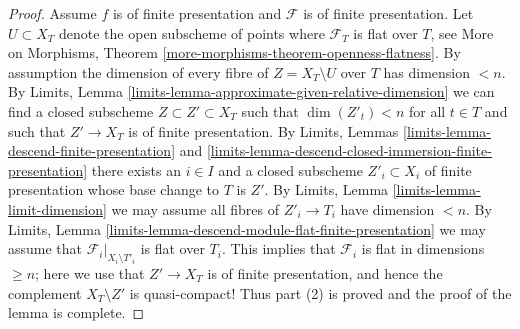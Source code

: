 \documentclass[10pt,a4paper]{amsart}
\theoremstyle{plain}
\theoremstyle{definition}
\theoremstyle{remark}
\numberwithin{equation}{subsection}
\begin{document}
\begin{proof}
\medskip\noindent
Assume $f$ is of finite presentation and $\mathcal{F}$ is of finite
presentation. Let $U \subset X_T$ denote the open subscheme of points where
$\mathcal{F}_T$ is flat over $T$, see
More on Morphisms, Theorem \ref{more-morphisms-theorem-openness-flatness}.
By assumption the dimension of every fibre of $Z = X_T \setminus U$ over
$T$ has dimension $< n$. By
Limits, Lemma \ref{limits-lemma-approximate-given-relative-dimension}
we can find a closed subscheme $Z \subset Z' \subset X_T$
such that $\dim(Z'_t) < n$ for all $t \in T$ and such that
$Z' \to X_T$ is of finite presentation. By
Limits, Lemmas \ref{limits-lemma-descend-finite-presentation} and
\ref{limits-lemma-descend-closed-immersion-finite-presentation}
there exists an $i \in I$ and a closed subscheme $Z'_i \subset X_i$
of finite presentation whose base change to $T$ is $Z'$. By
Limits, Lemma \ref{limits-lemma-limit-dimension}
we may assume all fibres of $Z'_i \to T_i$ have dimension $< n$. By
Limits, Lemma \ref{limits-lemma-descend-module-flat-finite-presentation}
we may assume that $\mathcal{F}_i|_{X_i \setminus T'_i}$
is flat over $T_i$. This implies that $\mathcal{F}_i$ is
flat in dimensions $\geq n$; here we use that $Z' \to X_T$ is of finite
presentation, and hence the complement $X_T \setminus Z'$ is quasi-compact!
Thus part (2) is proved and the proof of the lemma is complete.
\end{proof}
\end{document}
